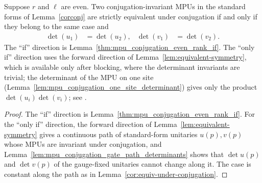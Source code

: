 \begin{theorem}
    \label{prop:conjsym-strict-equiv}
    \notready
    Suppose $r$ and $\ell$ are even. Two conjugation-invariant MPUs in the
    standard forms of Lemma~\ref{corconj} are strictly equivalent under
    conjugation if and only if they belong to the same case and
    \begin{align}
        \det(u_1) & =\det(u_2), &
        \det(v_1) & =\det(v_2).
    \end{align}
    The ``if'' direction is
    Lemma~\ref{thm:mpu_conjugation_even_rank_if}. The ``only if'' direction
    uses the forward direction of Lemma~\ref{lem:equivalent-symmetry}, which
    is available only after blocking, where the determinant invariants are
    trivial; the determinant of the MPU on one site
    (Lemma~\ref{lem:mpu_conjugation_one_site_determinant}) gives only the
    product $\det(u_i)\det(v_i)$; see
    \cite{gap:mpu_symmetry_path_criterion_blocking}.
\end{theorem}

\begin{proof}
    The ``if'' direction is Lemma~\ref{thm:mpu_conjugation_even_rank_if}. For the
    ``only if'' direction, the forward direction of
    Lemma~\ref{lem:equivalent-symmetry} gives a continuous path of
    standard-form unitaries $u(p),v(p)$ whose MPUs are invariant under
    conjugation, and Lemma~\ref{lem:mpu_conjugation_gate_path_determinants}
    shows that $\det u(p)$ and $\det v(p)$ of the gauge-fixed unitaries cannot
    change along it. The case is constant along the path as in
    Lemma~\ref{cor:equiv-under-conjugation}.
\end{proof}

